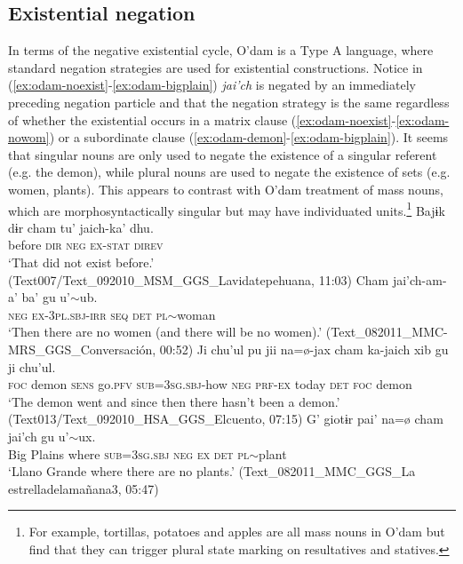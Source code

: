 \documentclass[output=paper,draft,draftmode,colorlinks,citecolor=brown]{langscibook}
\begin{document}
\subsection{Existential negation}
\label{sec:odam-exneg}
In terms of the negative existential cycle, O’dam is a Type A language, where standard negation strategies are used for existential constructions. Notice in (\ref{ex:odam-noexist}-\ref{ex:odam-bigplain}) \emph{jai’ch} is negated by an immediately preceding negation particle and that the negation strategy is the same regardless of whether the existential occurs in a matrix clause (\ref{ex:odam-noexist}-\ref{ex:odam-nowom}) or a subordinate clause (\ref{ex:odam-demon}-\ref{ex:odam-bigplain}). It seems that singular nouns are only used to negate the existence of a singular referent (e.g. the demon), while plural nouns are used to negate the existence of sets (e.g. women, plants). This appears to contrast with O’dam treatment of mass nouns, which are morphosyntactically singular but may have individuated units.\footnote{For example, tortillas, potatoes and apples are all mass nouns in O’dam but \citet{everdelld2019} find that they can trigger plural state marking on resultatives and statives.}
\ea
\label{ex:odam-noexist}
\gll Bajɨk	dɨr 	{cham tu'} 	jaich-ka' 	dhu.\\
before 	\textsc{dir} 	\textsc{neg}		\textsc{ex-stat}	\textsc{direv}\\
\glt ‘That did not exist before.’ (Text007/Text\_092010\_MSM\_GGS\_Lavidatepehuana, 11:03)
\z 
\ea
\label{ex:odam-nowom}
\gll Cham 	jai’ch-am-a’ 		ba’ 	gu 	u’$\sim$ub.\\
\textsc{neg}	\textsc{ex-3pl.sbj-irr}	\textsc{seq}	\textsc{det}	\textsc{pl}$\sim$woman\\
\glt ‘Then there are no women (and there will be no women).’ (Text\_082011\_MMC-MRS\_GGS\_Conversación, 00:52)
\z 
\ea
\label{ex:odam-demon}
\gll Ji 	chu'ul 		pu	jii     		na=\o-jax	cham	ka-jaich 	xib gu  	ji 	chu'ul.\\
\textsc{foc}	demon   	\textsc{sens} 	go.\textsc{pfv} 	\textsc{sub=3sg.sbj}-how 	\textsc{neg}  	\textsc{prf-ex} today \textsc{det} 	\textsc{foc}	demon\\
\glt ‘The demon went and since then there hasn’t been a demon.’ (Text013/Text\_092010\_HSA\_GGS\_Elcuento, 07:15)
\z 
\ea
\label{ex:odam-bigplain}
\gll G{\ɇ}' 	giotɨr 	pai' 	{na=\o} 	cham 	jai'ch 	gu 	u'$\sim$ux.\\
Big	Plains	where	\textsc{sub=3sg.sbj}	\textsc{neg}	\textsc{ex}	\textsc{det}	\textsc{pl}$\sim$plant\\
\glt ‘Llano Grande where there are no plants.’ (Text\_082011\_MMC\_GGS\_La estrelladelamañana3, 05:47)
\z 
\end{document}
